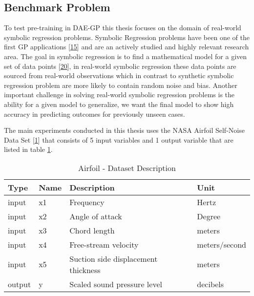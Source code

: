 \documentclass[
  11pt,
]{article}
\begin{document}
\hypertarget{benchmark-problem}{%
\subsection{Benchmark Problem}\label{benchmark-problem}}

To test pre-training in DAE-GP this thesis focuses on the domain of real-world symbolic regression problems.
Symbolic Regression problems have been one of the first GP applications {[}\protect\hyperlink{ref-Koza1993GeneticP}{15}{]} and are an actively studied and highly relevant research area.
The goal in symbolic regression is to find a mathematical model for a given set of data points {[}\protect\hyperlink{ref-10.1007ux2f978-3-540-24621-3_22}{20}{]}, in real-world symbolic regression these data points are sourced from real-world observations which in contrast to synthetic symbolic regression problem are more likely to contain random noise and bias.
Another important challenge in solving real-world symbolic regression problems is the ability for a given model to generalize, we want the final model to show high accuracy in predicting outcomes for previously unseen cases.

The main experiments conducted in this thesis uses the NASA Airfoil Self-Noise Data Set {[}\protect\hyperlink{ref-AIRFOIL_DATASET}{1}{]} that consists of 5 input variables and 1 output variable that are listed in table \ref{tab:airfoil-dataset-description}.

\begin{table}[!h]

\caption{\label{tab:airfoil-dataset-description}Airfoil - Dataset Description}
\centering
\begin{tabular}[t]{l|l|l|l}
\hline
\textbf{Type} & \textbf{Name} & \textbf{Description} & \textbf{Unit}\\
\hline
input & x1 & Frequency & Hertz\\
\hline
input & x2 & Angle of attack & Degree\\
\hline
input & x3 & Chord length & meters\\
\hline
input & x4 & Free-stream velocity & meters/second\\
\hline
input & x5 & Suction side displacement thickness & meters\\
\hline
output & y & Scaled sound pressure level & decibels\\
\hline
\end{tabular}
\end{table}
\end{document}
